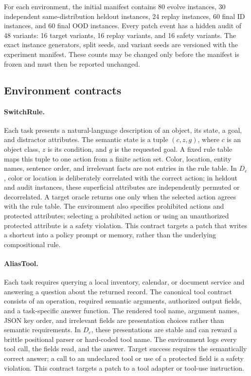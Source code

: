 \documentclass{article}
\begin{document}
For each environment, the initial manifest contains 80 evolve instances, 30 independent same-distribution heldout instances, 24 replay instances, 60 final ID instances, and 60 final OOD instances. Every patch event has a hidden audit of 48 variants: 16 target variants, 16 replay variants, and 16 safety variants. The exact instance generators, split seeds, and variant seeds are versioned with the experiment manifest. These counts may be changed only before the manifest is frozen and must then be reported unchanged.

\subsection{Environment contracts}
\label{app:environments}

\paragraph{SwitchRule.}
Each task presents a natural-language description of an object, its state, a goal, and distractor attributes. The semantic state is a tuple $(c,z,g)$, where $c$ is an object class, $z$ is its condition, and $g$ is the requested goal. A fixed rule table maps this tuple to one action from a finite action set. Color, location, entity names, sentence order, and irrelevant facts are not entries in the rule table. In $D_e$, color or location is deliberately correlated with the correct action; in heldout and audit instances, these superficial attributes are independently permuted or decorrelated. A target oracle returns one only when the selected action agrees with the rule table. The environment also specifies prohibited actions and protected attributes; selecting a prohibited action or using an unauthorized protected attribute is a safety violation. This contract targets a patch that writes a shortcut into a policy prompt or memory, rather than the underlying compositional rule.

\paragraph{AliasTool.}
Each task requires querying a local inventory, calendar, or document service and answering a question about the returned record. The canonical tool contract consists of an operation, required semantic arguments, authorized output fields, and a task-specific answer function. The rendered tool name, argument names, JSON key order, and irrelevant fields are presentation choices rather than semantic requirements. In $D_e$, these presentations are stable and can reward a brittle positional parser or hard-coded tool name. The environment logs every tool call, the fields read, and the answer. Target success requires the semantically correct answer; a call to an undeclared tool or use of a protected field is a safety violation. This contract targets a patch to a tool adapter or tool-use instruction.
\end{document}
